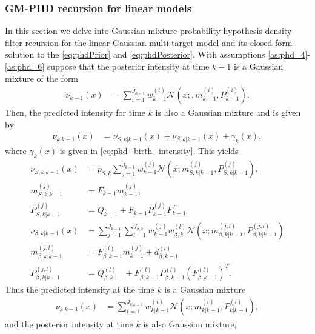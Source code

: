         \subsubsection{GM-PHD recursion for linear models}
In this section we delve into Gaussian mixture probability hypothesis density filter recursion for the linear Gaussian multi-target model and its closed-form solution to the \eqref{eq:phdPrior} and \eqref{eq:phdPosterior}. With assumptions \ref{as:phd_4}-\ref{as:phd_6} suppose that the posterior intensity at time $k-1$ is a Gaussian mixture of the form
\begin{align}
    \nu_{k-1}(x) &= \sum_{i=1}^{J_{k-1}} w_{k-1}^{(i)} \mathcal{N}(x;, m_{k-1}^{(i)}, P_{k-1}^{(i)}). \label{eq:phd_recursion_posterior}
\end{align}
Then, the predicted intensity for time $k$ is also a Gaussian mixture and is given by
\begin{align}
    \nu_{k|k-1}(x) &= \nu_{S,k|k-1}(x) + \nu_{\beta, k|k-1}(x) + \gamma_k(x),
    \label{eq:phd_recursion_predict}
\end{align}
where $\gamma_k(x)$ is given in \eqref{eq:phd_birth_intensity}. This yields
\begin{align}
    \nu_{S,k|k-1}(x) &= p_{S,k}\sum_{j=1}^{J_{k-1}}w_{k-1}^{(j)} \mathcal{N}(x;m_{S,k|k-1}^{(j)}, P_{S,k|k-1}^{(j)}) \label{eq:recursion_predict_intensity}, \\
    m_{S,k|k-1}^{(j)} &= F_{k-1}m_{k-1}^{(j)},  \label{eq:recursion_predict_m} \\
    P_{S,k|k-1}^{(j)} &= Q_{k-1} + F_{k-1}P_{k-1}^{(j)}F_{k-1}^T  \label{eq_recursion_predict_P} \\
    \nu_{\beta,k|k-1}(x) &= \sum_{j=1}^{J_{k-1}} \sum_{l=1}^{J_{\beta,k}} w_{k-1}^{(j)} w_{\beta,k}^{(l)} \mathcal{N}(x;m_{\beta,k|k-1}^{(j, l)},P_{\beta,k|k-1}^{(j,l)}) \\
    m_{\beta,k|k-1}^{(j, l)} &= F_{\beta,k-1}^{(l)} m_{k-1}^{(j)} + d_{\beta,k-1}^{(l)} \\
    P_{\beta,k|k-1}^{(j, l)} &= Q_{\beta,k-1}^{(l)} + F_{\beta,k-1}^{(l)} P_{\beta,k-1}^{(l)} (F_{\beta,k-1}^{(l)})^T.
\end{align}
Thus the predicted intensity at the time $k$ is a Gaussian mixture
\begin{align}
    \nu_{k|k-1}(x) &= \sum_{i=1}^{J_{k|k-1}}w_{k|k-1}^{(i)} \mathcal{N}(x;m_{k|k-1}^{(i)}, P_{k|k-1}^{(i)}),  \label{eq:recursion_predict_intesity}
\end{align}
and the posterior intensity at time $k$ is also Gaussian mixture,
